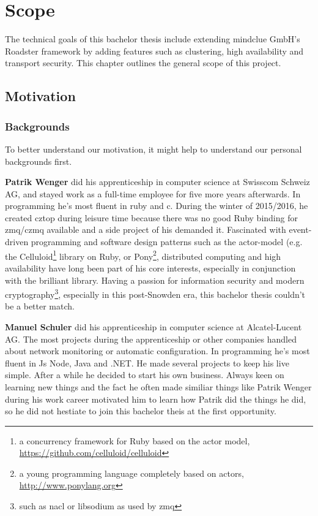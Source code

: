 \chapter{Scope}
The technical goals of this bachelor thesis include extending mindclue GmbH's
Roadster framework by adding features such as clustering, high availability and
transport security. This chapter outlines the general scope of this project.

\section{Motivation}

\subsection*{Backgrounds}
To better understand our motivation, it might help to understand our personal
backgrounds first.

\textbf{Patrik Wenger} did his apprenticeship in computer science at Swisscom
Schweiz AG, and stayed work as a full-time employee for five more years
afterwards. In programming he's most fluent in \gls{ruby} and \gls{c}. During
the winter of 2015/2016, he created \gls{cztop} during leisure time because
there was no good Ruby binding for \gls{zmq}/\gls{czmq} available and a side
project of his demanded it. Fascinated with event-driven programming and
software design patterns such as the \gls{actor-model} (e.g. the
Celluloid\footnote{a concurrency framework for Ruby based on the actor model,
\url{https://github.com/celluloid/celluloid}} library on Ruby, or
Pony\footnote{a young programming language completely based on actors,
\url{http://www.ponylang.org}}, distributed computing and high availability
have long been part of his core interests, especially in conjunction with the
brilliant \zmq library. Having a passion for information security and modern
cryptography\footnote{such as \gls{nacl} or \gls{libsodium} as used by
\gls{zmq}}, especially in this post-Snowden era, this bachelor thesis couldn't
be a better match.

\textbf{Manuel Schuler} did his apprenticeship in computer science at Alcatel-Lucent AG.
The most projects during the apprenticeship or other companies handled about network monitoring or
automatic configuration. In programming he's most fluent in Js Node, Java and .NET. He
made several projects to keep his live simple. After a while he decided to start his own business.
Always keen on learning new things and the fact he often made similiar things like Patrik Wenger during his work
career motivated him to learn how Patrik did the things he did,
so he did not hestiate to join this bachelor theis at the first opportunity.


